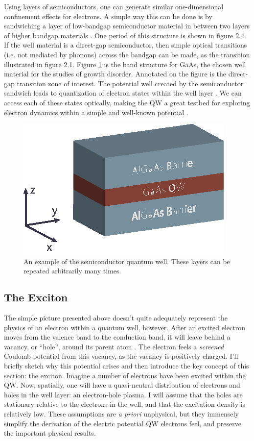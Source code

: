 \indent Using layers of semiconductors, one can generate similar one-dimensional confinement effects for electrons. A simple way this can be done is by sandwiching a layer of low-bandgap semiconductor material in between two layers of higher bandgap materials \cite{davies}. One period of this structure is shown in figure 2.4. If the well material is a direct-gap semiconductor, then simple optical transitions (i.e. not mediated by phonons) across the bandgap can be made, as the transition illustrated in figure 2.1. Figure \ref{GaAsBstruct} is the band structure for GaAs, the chosen well material for the studies of growth disorder. Annotated on the figure is the direct-gap transition zone of interest. The potential well created by the semiconductor sandwich leads to quantization of electron states within the well layer \cite{miller, davies, stevereview}. We can access each of these states optically, making the QW a great testbed for exploring electron dynamics within a simple and well-known potential \cite{stevereview}. 




\begin{figure}[h!]
\centering
\includegraphics[width = .4\textwidth]{Well.eps}
\caption{\doublespacing An example of the semiconductor quantum well. These layers can be repeated arbitrarily many times.}
\label{GaAsBstruct}
\end{figure}

\newpage
\subsection{The Exciton}

\indent The simple picture presented above doesn't quite adequately represent the physics of an electron within a quantum well, however. After an excited electron moves from the valence band to the conduction band, it will leave behind a vacancy, or ``hole'', around its parent atom \cite{miller, davies}. The electron feels a \textit{screened} Coulomb potential from this vacancy, as the vacancy is positively charged. I'll briefly sketch why this potential arises and then introduce the key concept of this section: the exciton. Imagine a number of electrons have been excited within the QW. Now, spatially, one will have a quasi-neutral distribution of electrons and holes in the well layer: an electron-hole plasma. I will assume that the holes are stationary relative to the electrons in the well, and that the excitation density is relatively low. These assumptions are \textit{a priori} unphysical, but they immensely simplify the derivation of the electric potential QW electrons feel, and preserve the important physical results. 

